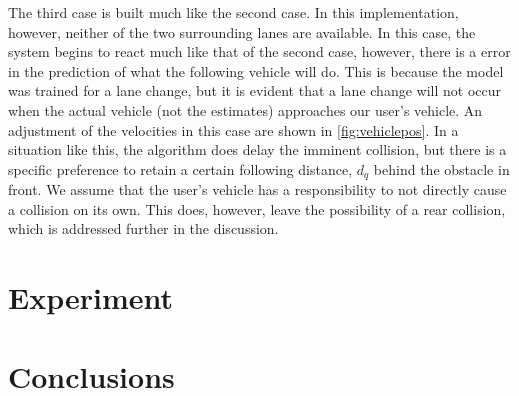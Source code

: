 \documentclass[conference]{IEEEtran}
\begin{document}
The third case is built much like the second case. In this implementation, however, neither of the two surrounding lanes are available. In this case, the system begins to react much like that of the second case, however, there is a error in the prediction of what the following vehicle will do. This is because the model was trained for a lane change, but it is evident that a lane change will not occur when the actual vehicle (not the estimates) approaches our user's vehicle. An adjustment of the velocities in this case are shown in \ref{fig:vehiclepos}. In a situation like this, the algorithm does delay the imminent collision, but there is a specific preference to retain a certain following distance, $d_q$ behind the obstacle in front. We assume that the user's vehicle has a responsibility to not directly cause a collision on its own. This does, however, leave the possibility of a rear collision, which is addressed further in the discussion.





\section{Experiment}
\section{Conclusions}

\newpage

%
%
%


  
  





\end{document}
